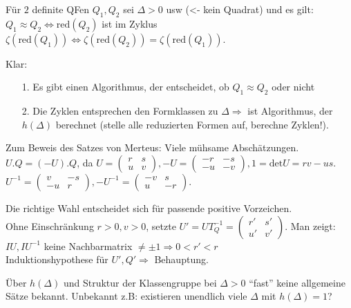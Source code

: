 \documentclass[a4paper,DIV15,BCOR12mm]{article}
\begin{document}
\begin{folgerung}
Für $2$ definite QFen $Q_1, Q_2$ sei $\Delta > 0$ usw (<- kein Quadrat) und es gilt:\\
$Q_1 \approx Q_2 \Leftrightarrow \text{red}(Q_2)$ ist im Zyklus $\zeta(\text{red}(Q_1)) \Leftrightarrow \zeta(\text{red}(Q_2)) = \zeta(\text{red}(Q_1))$.
\end{folgerung}

Klar:
\begin{itemize}
\item[1.] Es gibt einen Algorithmus, der entscheidet, ob $Q_1 \approx Q_2$ oder nicht
\item[2.] Die Zyklen entsprechen den Formklassen zu $\Delta \Rightarrow$ ist Algorithmus, der $h(\Delta)$ berechnet (stelle alle reduzierten Formen auf, berechne Zyklen!).
\end{itemize}

Zum Beweis des Satzes von Merteus: Viele mühsame Abschätzungen.\\

$U.Q = (-U).Q$, da $U = \begin{pmatrix}r & s\\u & v\end{pmatrix}, -U = \begin{pmatrix}-r & -s\\-u & -v\end{pmatrix}, 1 = \text{det}U =rv - us$. $U^{-1} = \begin{pmatrix}v & -s\\-u & r\end{pmatrix}, -U^{-1} = \begin{pmatrix}-v & s\\u & -r\end{pmatrix}$.

Die richtige Wahl entscheidet sich für passende positive Vorzeichen.\\
Ohne Einschränkung $r > 0, v > 0$, setzte $U' = UT_Q^{-1} = \begin{pmatrix}r' & s'\\u' & v'\end{pmatrix}$. Man zeigt: $IU, IU^{-1}$ keine Nachbarmatrix $\not= \pm 1 \Rightarrow 0 < r' < r$\\
Induktionshypothese für $U', Q' \Rightarrow$ Behauptung.

Über $h(\Delta)$ und Struktur der Klassengruppe bei $\Delta > 0$ "`fast"' keine allgemeine Sätze bekannt. Unbekannt z.B: existieren unendlich viele $\Delta$ mit $h(\Delta) = 1$?
\end{document}
